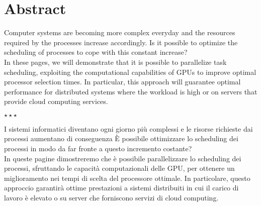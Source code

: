 \chapter*{Abstract}
Computer systems are becoming more complex everyday and the resources required by the processes increase accordingly. Is it possible to optimize the scheduling of processes to cope with this constant increase? \\
In these pages, we will demonstrate that it is possible to parallelize task scheduling, exploiting the computational capabilities of GPUs to improve optimal processor selection times. In particular, this approach will guarantee optimal performance for distributed systems where the workload is high or on servers that provide cloud computing services.\\
\vspace{50pt}
\begin{center}
\large$\star\star\star$
\end{center}
\vspace{50pt}
I sistemi informatici diventano ogni giorno più complessi e le risorse richieste dai processi aumentano di conseguenza È possibile ottimizzare lo scheduling dei processi in modo da far fronte a questo incremento costante?\\
In queste pagine dimostreremo che è possibile parallelizzare lo scheduling dei processi, sfruttando le capacità computazionali delle GPU, per ottenere un miglioramento nei tempi di scelta del processore ottimale. In particolare, questo approccio garantirà ottime prestazioni a sistemi distribuiti in cui il carico di lavoro è elevato o su server che forniscono servizi di cloud computing.

